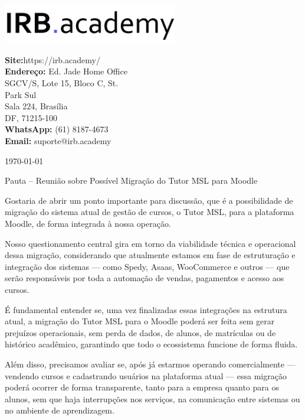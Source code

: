 \documentclass[12pt, a4paper]{letter} %
\begin{document}
\begin{minipage}{0.6\textwidth}
	\includegraphics[width=3in]{IRB.png}
\end{minipage}
\hfill
\begin{minipage}{0.4\textwidth}\raggedright
	\small{\textbf{\color{umdred}Site:}\hphantom{A}https://irb.academy/\\
		\textbf{\color{umdred}Endereço:}\hphantom{A} Ed. Jade Home Office\\
		\hphantom{AA}SGCV/S, Lote 15, Bloco C, St.\\
		\hphantom{AA}Park Sul\\
		\hphantom{AA}Sala 224, Brasília\\
		\hphantom{AA}DF, 71215-100\\
		\textbf{\color{umdred}WhatsApp: }(61) 8187-4673\\
		\textbf{\color{umdred}Email: }suporte@irb.academy }
\end{minipage}

\today

Pauta – Reunião sobre Possível Migração do Tutor MSL para Moodle

Gostaria de abrir um ponto importante para discussão, que é a possibilidade de migração do sistema atual de gestão de cursos, o Tutor MSL, para a plataforma Moodle, de forma integrada à nossa operação.

Nosso questionamento central gira em torno da viabilidade técnica e operacional dessa migração, considerando que atualmente estamos em fase de estruturação e integração dos sistemas — como Spedy, Asaas, WooCommerce e outros — que serão responsáveis por toda a automação de vendas, pagamentos e acesso aos cursos.

É fundamental entender se, uma vez finalizadas essas integrações na estrutura atual, a migração do Tutor MSL para o Moodle poderá ser feita sem gerar prejuízos operacionais, sem perda de dados, de alunos, de matrículas ou de histórico acadêmico, garantindo que todo o ecossistema funcione de forma fluida.

Além disso, precisamos avaliar se, após já estarmos operando comercialmente — vendendo cursos e cadastrando usuários na plataforma atual — essa migração poderá ocorrer de forma transparente, tanto para a empresa quanto para os alunos, sem que haja interrupções nos serviços, na comunicação entre sistemas ou no ambiente de aprendizagem.
\end{document}

